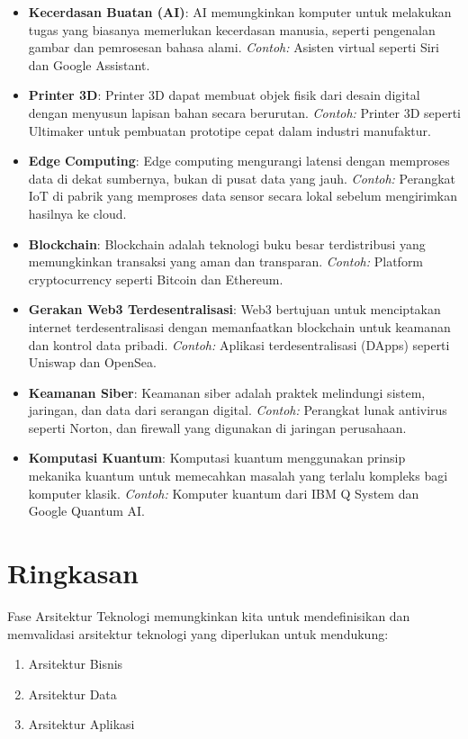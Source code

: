 \begin{itemize}
	\item \textbf{Kecerdasan Buatan (AI)}: AI memungkinkan komputer untuk melakukan tugas yang biasanya memerlukan kecerdasan manusia, seperti pengenalan gambar dan pemrosesan bahasa alami. \emph{Contoh:} Asisten virtual seperti Siri dan Google Assistant.
	
	\item \textbf{Printer 3D}: Printer 3D dapat membuat objek fisik dari desain digital dengan menyusun lapisan bahan secara berurutan. \emph{Contoh:} Printer 3D seperti Ultimaker untuk pembuatan prototipe cepat dalam industri manufaktur.
	
	\item \textbf{Edge Computing}: Edge computing mengurangi latensi dengan memproses data di dekat sumbernya, bukan di pusat data yang jauh. \emph{Contoh:} Perangkat IoT di pabrik yang memproses data sensor secara lokal sebelum mengirimkan hasilnya ke cloud.
	
	\item \textbf{Blockchain}: Blockchain adalah teknologi buku besar terdistribusi yang memungkinkan transaksi yang aman dan transparan. \emph{Contoh:} Platform cryptocurrency seperti Bitcoin dan Ethereum.
	
	\item \textbf{Gerakan Web3 Terdesentralisasi}: Web3 bertujuan untuk menciptakan internet terdesentralisasi dengan memanfaatkan blockchain untuk keamanan dan kontrol data pribadi. \emph{Contoh:} Aplikasi terdesentralisasi (DApps) seperti Uniswap dan OpenSea.
	
	\item \textbf{Keamanan Siber}: Keamanan siber adalah praktek melindungi sistem, jaringan, dan data dari serangan digital. \emph{Contoh:} Perangkat lunak antivirus seperti Norton, dan firewall yang digunakan di jaringan perusahaan.
	
	\item \textbf{Komputasi Kuantum}: Komputasi kuantum menggunakan prinsip mekanika kuantum untuk memecahkan masalah yang terlalu kompleks bagi komputer klasik. \emph{Contoh:} Komputer kuantum dari IBM Q System dan Google Quantum AI.
\end{itemize}

\section{Ringkasan}
Fase Arsitektur Teknologi memungkinkan kita untuk mendefinisikan dan memvalidasi arsitektur teknologi yang diperlukan untuk mendukung:
\begin{enumerate}
	\item Arsitektur Bisnis
	\item Arsitektur Data
	\item Arsitektur Aplikasi
\end{enumerate}
